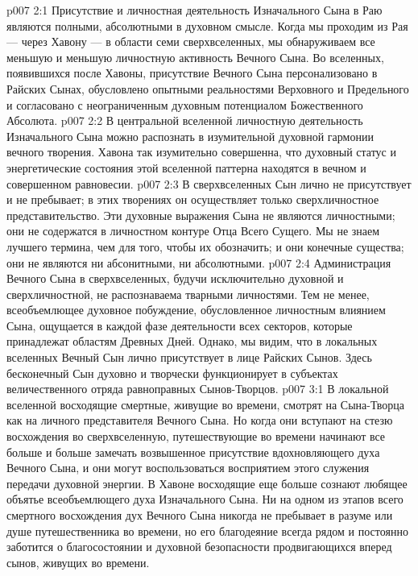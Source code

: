 \vs p007 2:1 Присутствие и личностная деятельность Изначального Сына в Раю являются полными, абсолютными в духовном смысле. Когда мы проходим из Рая --- через Хавону --- в области семи сверхвселенных, мы обнаруживаем все меньшую и меньшую личностную активность Вечного Сына. Во вселенных, появившихся после Хавоны, присутствие Вечного Сына персонализовано в Райских Сынах, обусловлено опытными реальностями Верховного и Предельного и согласовано с неограниченным духовным потенциалом Божественного Абсолюта.
\vs p007 2:2 В центральной вселенной личностную деятельность Изначального Сына можно распознать в изумительной духовной гармонии вечного творения. Хавона так изумительно совершенна, что духовный статус и энергетические состояния этой вселенной паттерна находятся в вечном и совершенном равновесии.
\vs p007 2:3 В сверхвселенных Сын лично не присутствует и не пребывает; в этих творениях он осуществляет только сверхличностное представительство. Эти духовные выражения Сына не являются личностными; они не содержатся в личностном контуре Отца Всего Сущего. Мы не знаем лучшего термина, чем  для того, чтобы их обозначить; и они конечные существа; они не являются ни абсонитными, ни абсолютными.
\vs p007 2:4 Администрация Вечного Сына в сверхвселенных, будучи исключительно духовной и сверхличностной, не распознаваема тварными личностями. Тем не менее, всеобъемлющее духовное побуждение, обусловленное личностным влиянием Сына, ощущается в каждой фазе деятельности всех секторов, которые принадлежат областям Древных Дней. Однако, мы видим, что в локальных вселенных Вечный Сын лично присутствует в лице Райских Сынов. Здесь бесконечный Сын духовно и творчески функционирует в субъектах величественного отряда равноправных Сынов\hyp{}Творцов.
\vs p007 3:1 В локальной вселенной восходящие смертные, живущие во времени, смотрят на Сына\hyp{}Творца как на личного представителя Вечного Сына. Но когда они вступают на стезю восхождения во сверхвселенную, путешествующие во времени начинают все больше и больше замечать возвышенное присутствие вдохновляющего духа Вечного Сына, и они могут воспользоваться восприятием этого служения передачи духовной энергии. В Хавоне восходящие еще больше сознают любящее объятье всеобъемлющего духа Изначального Сына. Ни на одном из этапов всего смертного восхождения дух Вечного Сына никогда не пребывает в разуме или душе путешественника во времени, но его благодеяние всегда рядом и постоянно заботится о благосостоянии и духовной безопасности продвигающихся вперед сынов, живущих во времени.
